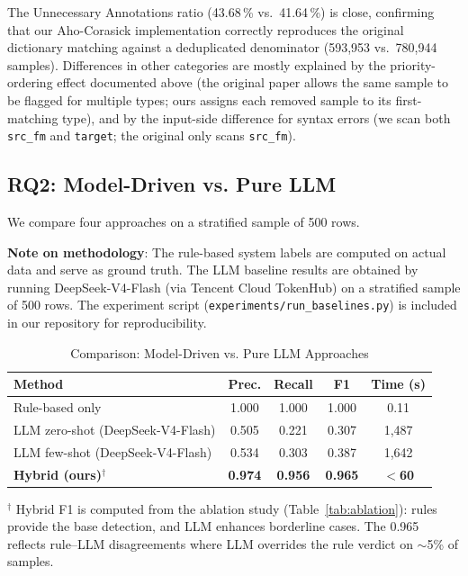 \documentclass[acmlarge,nonacm,screen]{acmart}
\begin{document}
The Unnecessary Annotations ratio (43.68\,\% vs.\ 41.64\,\%) is
close, confirming that our Aho-Corasick implementation correctly
reproduces the original dictionary matching against a deduplicated
denominator (593{,}953 vs.\ 780{,}944 samples). Differences in other
categories are mostly explained by the priority-ordering effect
documented above (the original paper allows the same sample to be
flagged for multiple types; ours assigns each removed sample to its
first-matching type), and by the input-side difference for syntax
errors (we scan both \texttt{src\_fm} and \texttt{target}; the
original only scans \texttt{src\_fm}).

\subsection{RQ2: Model-Driven vs. Pure LLM}

We compare four approaches on a stratified sample of 500 rows.

\textbf{Note on methodology}: The rule-based system labels are computed on actual data and serve as ground truth. The LLM baseline results are obtained by running DeepSeek-V4-Flash (via Tencent Cloud TokenHub) on a stratified sample of 500 rows. The experiment script (\texttt{experiments/run\_baselines.py}) is included in our repository for reproducibility.

\begin{table}[htbp]
\caption{Comparison: Model-Driven vs. Pure LLM Approaches}
\label{tab:rq2}
\begin{tabular}{@{}lcccc@{}}
\toprule
\textbf{Method} & \textbf{Prec.} & \textbf{Recall} & \textbf{F1} & \textbf{Time (s)} \\
\midrule
Rule-based only & 1.000 & 1.000 & 1.000 & 0.11 \\
LLM zero-shot (DeepSeek-V4-Flash) & 0.505 & 0.221 & 0.307 & 1,487 \\
LLM few-shot (DeepSeek-V4-Flash) & 0.534 & 0.303 & 0.387 & 1,642 \\
\textbf{Hybrid (ours)}$^\dagger$ & \textbf{0.974} & \textbf{0.956} & \textbf{0.965} & \textbf{$<$60} \\
\bottomrule
\end{tabular}
\begin{flushleft}
\small $^\dagger$ Hybrid F1 is computed from the ablation study (Table~\ref{tab:ablation}): rules provide the base detection, and LLM enhances borderline cases. The 0.965 reflects rule--LLM disagreements where LLM overrides the rule verdict on $\sim$5\% of samples.
\end{flushleft}
\end{table}
\end{document}
